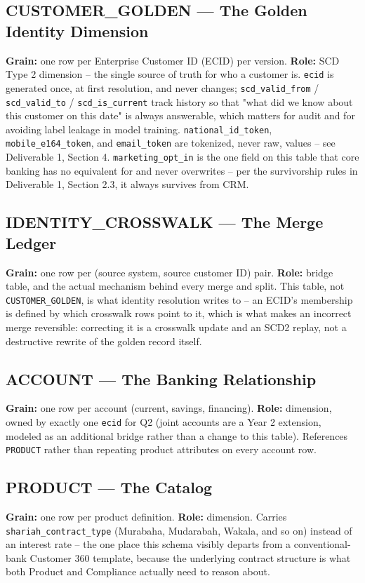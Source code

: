 \documentclass[11pt]{article}
\begin{document}
\subsection{CUSTOMER\_GOLDEN --- The Golden Identity Dimension}
\textbf{Grain:} one row per Enterprise Customer ID (ECID) per version. \textbf{Role:} SCD Type 2 dimension -- the single source of truth for who a customer is. \texttt{ecid} is generated once, at first resolution, and never changes; \texttt{scd\_valid\_from} / \texttt{scd\_valid\_to} / \texttt{scd\_is\_current} track history so that "what did we know about this customer on this date" is always answerable, which matters for audit and for avoiding label leakage in model training. \texttt{national\_id\_token}, \texttt{mobile\_e164\_token}, and \texttt{email\_token} are tokenized, never raw, values -- see Deliverable 1, Section 4. \texttt{marketing\_opt\_in} is the one field on this table that core banking has no equivalent for and never overwrites -- per the survivorship rules in Deliverable 1, Section 2.3, it always survives from CRM.

\subsection{IDENTITY\_CROSSWALK --- The Merge Ledger}
\textbf{Grain:} one row per (source system, source customer ID) pair. \textbf{Role:} bridge table, and the actual mechanism behind every merge and split. This table, not \texttt{CUSTOMER\_GOLDEN}, is what identity resolution writes to -- an ECID's membership is defined by which crosswalk rows point to it, which is what makes an incorrect merge reversible: correcting it is a crosswalk update and an SCD2 replay, not a destructive rewrite of the golden record itself.

\subsection{ACCOUNT --- The Banking Relationship}
\textbf{Grain:} one row per account (current, savings, financing). \textbf{Role:} dimension, owned by exactly one \texttt{ecid} for Q2 (joint accounts are a Year 2 extension, modeled as an additional bridge rather than a change to this table). References \texttt{PRODUCT} rather than repeating product attributes on every account row.

\subsection{PRODUCT --- The Catalog}
\textbf{Grain:} one row per product definition. \textbf{Role:} dimension. Carries \texttt{shariah\_contract\_type} (Murabaha, Mudarabah, Wakala, and so on) instead of an interest rate -- the one place this schema visibly departs from a conventional-bank Customer 360 template, because the underlying contract structure is what both Product and Compliance actually need to reason about.
\end{document}
